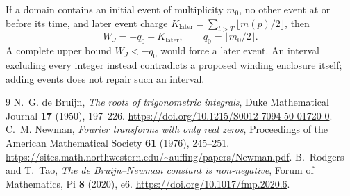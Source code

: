 \documentclass[11pt]{article}
\theoremstyle{definition}
\begin{document}
If a domain contains an initial event of multiplicity \(m_0\), no other
event at or before its time, and later event charge
\(K_{\mathrm{later}}=\sum_{t>T}\lfloor m(p)/2\rfloor\), then
\[
 W_J=-q_0-K_{\mathrm{later}},\qquad q_0=\lfloor m_0/2\rfloor.
\]
A complete upper bound \(W_J<-q_0\) would force a later event.
An interval excluding every integer instead contradicts a proposed
winding enclosure itself; adding events does not repair such an interval.



\begin{thebibliography}{9}
N.~G. de Bruijn, \emph{The roots of trigonometric integrals},
Duke Mathematical Journal \textbf{17} (1950), 197--226.
\url{https://doi.org/10.1215/S0012-7094-50-01720-0}.
C.~M. Newman, \emph{Fourier transforms with only real zeros},
Proceedings of the American Mathematical Society \textbf{61} (1976),
245--251.
\url{https://sites.math.northwestern.edu/~auffing/papers/Newman.pdf}.
B.~Rodgers and T.~Tao, \emph{The de Bruijn--Newman constant is non-negative},
Forum of Mathematics, Pi \textbf{8} (2020), e6.
\url{https://doi.org/10.1017/fmp.2020.6}.
\end{thebibliography}
\end{document}
